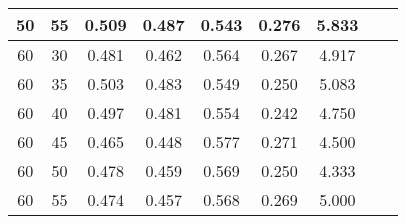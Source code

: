 \begin{longtable}[c]{|c|c|c|c|c|c|c|c|c|}
 50 & 55 & 0.509 & 0.487 & 0.543 & 0.276 & 5.833  \\ \hline 
 60 & 30 & 0.481 & 0.462 & 0.564 & 0.267 & 4.917  \\ \hline 
 60 & 35 & 0.503 & 0.483 & 0.549 & 0.250 & 5.083  \\ \hline 
 60 & 40 & 0.497 & 0.481 & 0.554 & 0.242 & 4.750  \\ \hline 
 60 & 45 & 0.465 & 0.448 & 0.577 & 0.271 & 4.500  \\ \hline 
 60 & 50 & 0.478 & 0.459 & 0.569 & 0.250 & 4.333  \\ \hline 
 60 & 55 & 0.474 & 0.457 & 0.568 & 0.269 & 5.000  \\ \hline 
 \end{longtable} 



 \newpage


